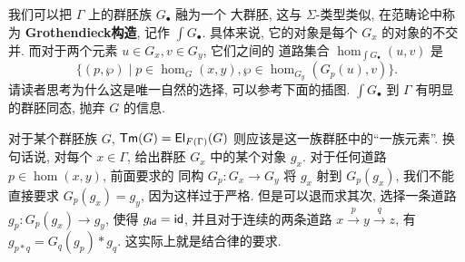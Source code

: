 \begin{center}
\end{center}

我们可以把 \(\Gamma\) 上的群胚族 \(G_\bullet\) 融为一个
大群胚, 这与 \(\Sigma\)-类型类似, 在范畴论中称为%
\textbf{Grothendieck构造}, 记作 \({\int} G_\bullet\).
具体来说, 它的对象是每个 \(G_x\) 的对象的不交并.
而对于两个元素 \(u \in G_x, v \in G_y\), 它们之间的
道路集合 \(\hom_{{\int} G_\bullet}(u,v)\) 是
\[\{(p, \wp) \mid p \in \hom_G(x,y), \wp \in \hom_{G_y}(G_p(u), v)\}.\]
请读者思考为什么这是唯一自然的选择, 可以参考下面的插图.
\({\int}G_\bullet\) 到 \(\Gamma\) 有明显的群胚同态,
抛弃 \(G\) 的信息.

对于某个群胚族 \(G\), \(\textnormal{\textsf{Tm}}(G)
= \textnormal{\textsf{El}}_{F(\Gamma)}(G)\)
则应该是这一族群胚中的“一族元素”. 换句话说, 对每个
\(x \in \Gamma\), 给出群胚 \(G_x\) 中的某个对象
\(g_x\). 对于任何道路 \(p \in \hom(x,y)\), 前面要求的
同构 \(G_p : G_x \to G_y\) 将 \(g_x\) 射到
\(G_p(g_x)\), 我们不能直接要求 \(G_p(g_x) = g_y\),
因为这样过于严格. 但是可以退而求其次, 选择一条道路
\(g_p : G_p(g_x) \to g_y\), 使得
\(g_{\textnormal{\textsf{id}}} = \textnormal{\textsf{id}}\), 并且对于连续的两条道路
\(x \xrightarrow p y \xrightarrow q z\), 有
\(g_{p * q} = G_q(g_p) * g_q\). 这实际上就是结合律的要求.

